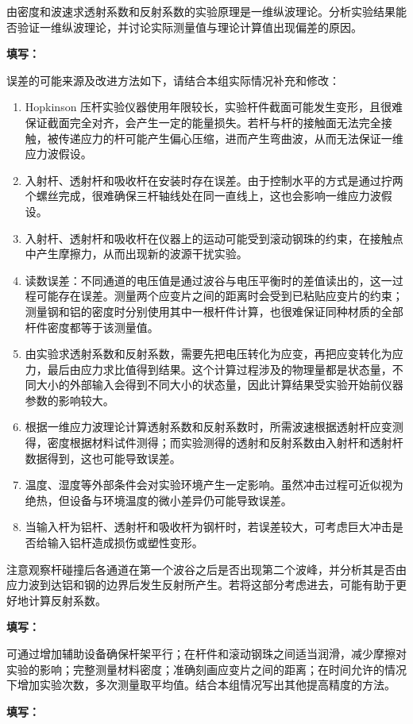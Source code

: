 \documentclass[UTF8,a4paper,12pt]{ctexart}
\newcommand{\blank}[1][2.5cm]{\mbox{\underline{\hspace{#1}}}}
\newcommand{\answer}{\par\noindent\textbf{填写：}\blank[0.86\textwidth]\par}
\numberwithin{equation}{section}
\begin{document}
由密度和波速求透射系数和反射系数的实验原理是一维纵波理论。分析实验结果能否验证一维纵波理论，并讨论实际测量值与理论计算值出现偏差的原因。
\answer

误差的可能来源及改进方法如下，请结合本组实际情况补充和修改：
\begin{enumerate}
  \item Hopkinson 压杆实验仪器使用年限较长，实验杆件截面可能发生变形，且很难保证截面完全对齐，会产生一定的能量损失。若杆与杆的接触面无法完全接触，被传递应力的杆可能产生偏心压缩，进而产生弯曲波，从而无法保证一维应力波假设。
  \item 入射杆、透射杆和吸收杆在安装时存在误差。由于控制水平的方式是通过拧两个螺丝完成，很难确保三杆轴线处在同一直线上，这也会影响一维应力波假设。
  \item 入射杆、透射杆和吸收杆在仪器上的运动可能受到滚动钢珠的约束，在接触点中产生摩擦力，从而出现新的波源干扰实验。
  \item 读数误差：不同通道的电压值是通过波谷与电压平衡时的差值读出的，这一过程可能存在误差。测量两个应变片之间的距离时会受到已粘贴应变片的约束；测量钢和铝的密度时分别使用其中一根杆件计算，也很难保证同种材质的全部杆件密度都等于该测量值。
  \item 由实验求透射系数和反射系数，需要先把电压转化为应变，再把应变转化为应力，最后由应力求比值得到结果。这个计算过程涉及的物理量都是状态量，不同大小的外部输入会得到不同大小的状态量，因此计算结果受实验开始前仪器参数的影响较大。
  \item 根据一维应力波理论计算透射系数和反射系数时，所需波速根据透射杆应变测得，密度根据材料试件测得；而实验测得的透射和反射系数由入射杆和透射杆数据得到，这也可能导致误差。
  \item 温度、湿度等外部条件会对实验环境产生一定影响。虽然冲击过程可近似视为绝热，但设备与环境温度的微小差异仍可能导致误差。
  \item 当输入杆为铝杆、透射杆和吸收杆为钢杆时，若误差较大，可考虑巨大冲击是否给输入铝杆造成损伤或塑性变形。
\end{enumerate}

注意观察杆碰撞后各通道在第一个波谷之后是否出现第二个波峰，并分析其是否由应力波到达铝和钢的边界后发生反射所产生。若将这部分考虑进去，可能有助于更好地计算反射系数。
\answer

可通过增加辅助设备确保杆架平行；在杆件和滚动钢珠之间适当润滑，减少摩擦对实验的影响；完整测量材料密度；准确刻画应变片之间的距离；在时间允许的情况下增加实验次数，多次测量取平均值。结合本组情况写出其他提高精度的方法。
\answer
\end{document}
